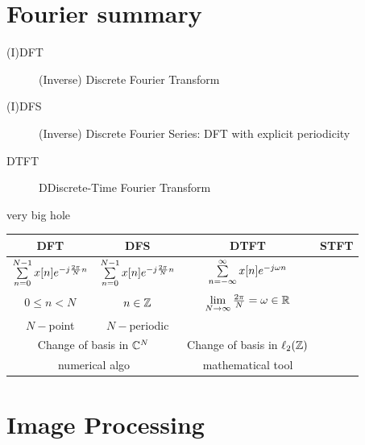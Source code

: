 \documentclass[11pt,a4paper]{article}
\begin{document}
\appendix
\section{Fourier summary}
\begin{description}
	\item[(I)DFT] (Inverse) Discrete Fourier Transform
	\item[(I)DFS] (Inverse) Discrete Fourier Series: DFT with explicit periodicity
	\item[DTFT] DDiscrete-Time Fourier Transform
\end{description}

{very big hole}

\begin{table}
	\begin{tabular}{cccc}
		\toprule
		DFT & DFS & DTFT & STFT\\
		\hline\addlinespace
		 $\somme{N-1}{n=0}x[n]e^{-j\frac{2\pi}{N}n}$ & $\somme{N-1}{n=0}x[n]e^{-j\frac{2\pi}{N}n}$ & $\somme{\infty}{n=-\infty}x[n]e^{-j\omega n}$\\
		 $0 \leq n < N$ & $n \in \Z$ & $\limite{N \to \infty} \frac{2\pi}{N} = \omega \in \R$\\
		 $N-$point & $N-$periodic & \\
		\multicolumn{2}{c}{Change of basis in $\C^N$} & Change of basis in $\ell_2(\Z)$\\
		\multicolumn{2}{c}{numerical algo} & mathematical tool
	\end{tabular}
\end{table}
\section{Image Processing}
\end{document}
